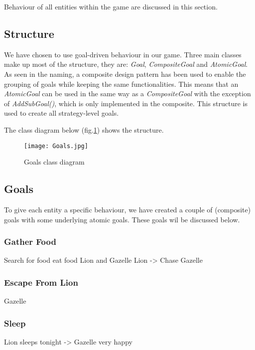 Behaviour of all entities within the game are discussed in this section.

\subsection{Structure}\label{subsec:behaviourStructure}
We have chosen to use goal-driven behaviour in our game.
Three main classes make up most of the structure, they are: \textit{Goal}, \textit{CompositeGoal} and \textit{AtomicGoal}.
As seen in the naming, a composite design pattern has been used to enable the grouping of goals while keeping the same functionalities.
This means that an \textit{AtomicGoal} can be used in the same way as a \textit{CompositeGoal} with the exception of \textit{AddSubGoal()},
which is only implemented in the composite.
This structure is used to create all strategy-level goals.

The class diagram below (fig.\ref{fig:behaviourClassDiagram}) shows the structure.

\begin{figure}[h!]
    \begin{center}
        \texttt{[image: Goals.jpg]}
    \end{center}
    \caption{Goals class diagram}
    \label{fig:behaviourClassDiagram}
\end{figure}


\subsection{Goals}\label{subsec:behaviourGoals}
To give each entity a specific behaviour, we have created a couple of (composite) goals with some underlying atomic goals.
These goals wil be discussed below.

\subsubsection{Gather Food}\label{sec:behaviourFood}
Search for food
eat food
Lion and Gazelle
Lion -> Chase Gazelle

\subsubsection{Escape From Lion}\label{sec:behaviourEscape}
Gazelle

\subsubsection{Sleep}\label{sec:behaviourSleep}
Lion sleeps tonight -> Gazelle very happy

